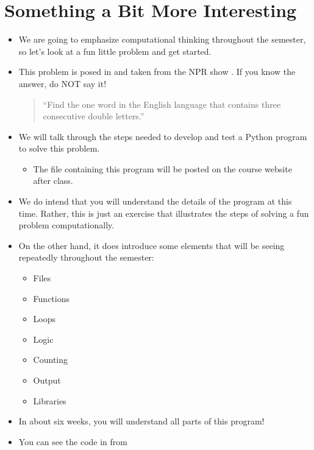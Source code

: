\documentclass[letterpaper,10pt,english]{sphinxmanual}
\begin{document}
\section{Something a Bit More Interesting}
\label{\detokenize{lecture_notes/lec01_intro:something-a-bit-more-interesting}}\begin{itemize}
\item {} 
We are going to emphasize computational thinking throughout the
semester, so let’s look at a fun little problem and get started.

\item {} 
This problem is posed in  and taken from the NPR show
. If you know the answer, do NOT say it!
\begin{quote}

“Find the one word in the English language that contains three
consecutive double letters.”
\end{quote}

\item {} 
We will talk through the steps needed to develop and test a Python
program to solve this problem.
\begin{itemize}
\item {} 
The file containing this program will be posted on the course
website after class.

\end{itemize}

\item {} 
We do  intend that you will understand the details of the
program at this time. Rather, this is just an exercise that
illustrates the steps of solving a fun problem computationally.

\item {} 
On the other hand, it does introduce some elements that will be
seeing repeatedly throughout the semester:
\begin{itemize}
\item {} 
Files

\item {} 
Functions

\item {} 
Loops

\item {} 
Logic

\item {} 
Counting

\item {} 
Output

\item {} 
Libraries

\end{itemize}

\item {} 
In about six weeks, you will understand all parts of this program!

\item {} 
You can see the code in  from 

\end{itemize}
\end{document}
